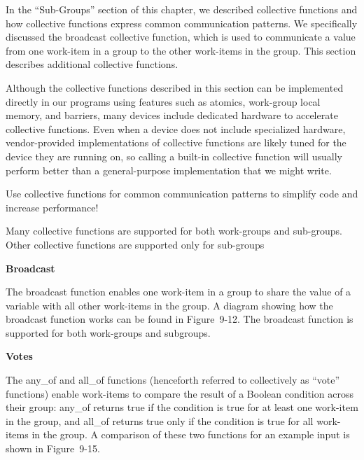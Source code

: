 In the “Sub-Groups” section of this chapter, we described collective functions and how collective functions express common communication patterns. We specifically discussed the broadcast collective function, which is used to communicate a value from one work-item in a group to the other work-items in the group. This section describes additional collective functions.\par

Although the collective functions described in this section can be implemented directly in our programs using features such as atomics, work-group local memory, and barriers, many devices include dedicated hardware to accelerate collective functions. Even when a device does not include specialized hardware, vendor-provided implementations of collective functions are likely tuned for the device they are running on, so calling a built-in collective function will usually perform better than a general-purpose implementation that we might write.\par

\begin{tcolorbox}[colback=red!5!white,colframe=red!75!black]
Use collective functions for common communication patterns to simplify code and increase performance!
\end{tcolorbox}

Many collective functions are supported for both work-groups and sub-groups. Other collective functions are supported only for sub-groups\par

\hspace*{\fill} \par %
\textbf{Broadcast}

The broadcast function enables one work-item in a group to share the value of a variable with all other work-items in the group. A diagram showing how the broadcast function works can be found in Figure 9-12. The broadcast function is supported for both work-groups and subgroups.\par

\hspace*{\fill} \par %
\textbf{Votes}

The any\_of and all\_of functions (henceforth referred to collectively as “vote” functions) enable work-items to compare the result of a Boolean condition across their group: any\_of returns true if the condition is true for at least one work-item in the group, and all\_of returns true only if the condition is true for all work-items in the group. A comparison of these two functions for an example input is shown in Figure 9-15.\par

